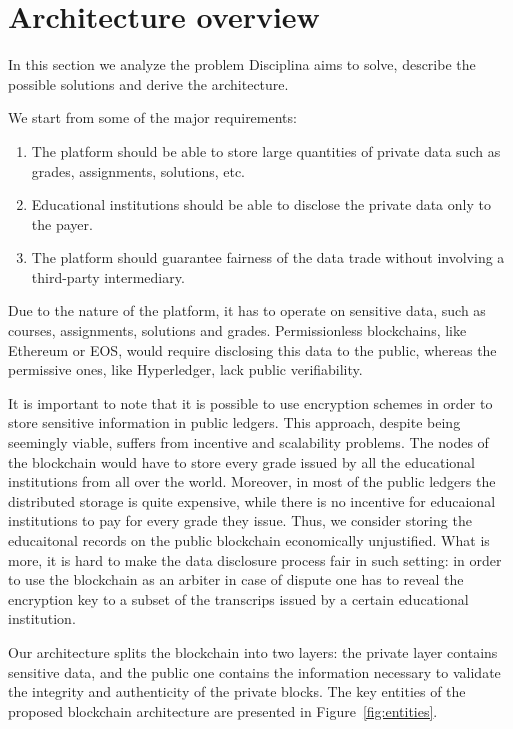 \section{Architecture overview}
\label{sec:architecture}

In this section we analyze the problem Disciplina aims to solve, describe the possible solutions and derive the architecture.

We start from some of the major requirements:

\begin{enumerate}
\item The platform should be able to store large quantities of private data such as grades, assignments, solutions, etc.
\item Educational institutions should be able to disclose the private data only to the payer.
\item The platform should guarantee fairness of the data trade without involving a third-party intermediary.
\end{enumerate}

Due to the nature of the platform, it has to operate on sensitive data, such as
courses, assignments, solutions and grades. Permissionless blockchains, like
Ethereum or EOS, would require disclosing this data to the public, whereas the
permissive ones, like Hyperledger, lack public verifiability.

It is important to note that it is possible to use encryption schemes in order
to store sensitive information in public ledgers. This approach, despite being
seemingly viable, suffers from incentive and scalability problems. The nodes of
the blockchain would have to store every grade issued by all the educational
institutions from all over the world. Moreover, in most of the public ledgers
the distributed storage is quite expensive, while there is no incentive for
educaional institutions to pay for every grade they issue. Thus, we consider
storing the educaitonal records on the public blockchain economically
unjustified. What is more, it is hard to make the data disclosure process fair
in such setting: in order to use the blockchain as an arbiter in case of dispute
one has to reveal the encryption key to a subset of the transcrips issued by a
certain educational institution.

Our architecture splits the blockchain into two layers: the private layer
contains sensitive data, and the public one contains the information necessary
to validate the integrity and authenticity of the private blocks. The key
entities of the proposed blockchain architecture are presented in
Figure~\ref{fig:entities}.

